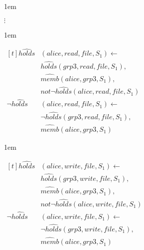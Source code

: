 \documentclass[global,twocolumn,final]{svjour}
\newenvironment{vexample}
  {\begin{example}\hspace{0.25em}}
  {\end{example}}
\newenvironment{vquote}
  {\begin{list}{}{\leftmargin 1em}\item[]}
  {\end{list}}
\begin{document}
\begin{vexample}
\begin{enumerate}
              \begin{vquote}
                \hspace{5em}$\vdots$
              \end{vquote}

              \begin{vquote}
                \begin{math}
                  \begin{aligned}[t]
                    \hat{holds}&(alice, read, file, S_{1}) \leftarrow \\
                    & \hat{holds}(grp3, read, file, S_{1}), \\
                    & \hat{memb}(alice, grp3, S_{1}), \\
                    & not \lnot \hat{holds}(alice, read, file, S_{1}) \\
                    \lnot \hat{holds}&(alice, read, file, S_{1}) \leftarrow \\
                    & \lnot \hat{holds}(grp3, read, file, S_{1}), \\
                    & \hat{memb}(alice, grp3, S_{1})
                  \end{aligned}
                \end{math}
              \end{vquote}

              \begin{vquote}
                \begin{math}
                  \begin{aligned}[t]
                    \hat{holds}&(alice, write, file, S_{1}) \leftarrow \\
                    & \hat{holds}(grp3, write, file, S_{1}), \\
                    & \hat{memb}(alice, grp3, S_{1}), \\
                    & not \lnot \hat{holds}(alice, write, file, S_{1}) \\
                    \lnot \hat{holds}&(alice, write, file, S_{1}) \leftarrow \\
                    & \lnot \hat{holds}(grp3, write, file, S_{1}), \\
                    & \hat{memb}(alice, grp3, S_{1})
                  \end{aligned}
                \end{math}
              \end{vquote}


\end{enumerate}
\end{vexample}
\end{document}
